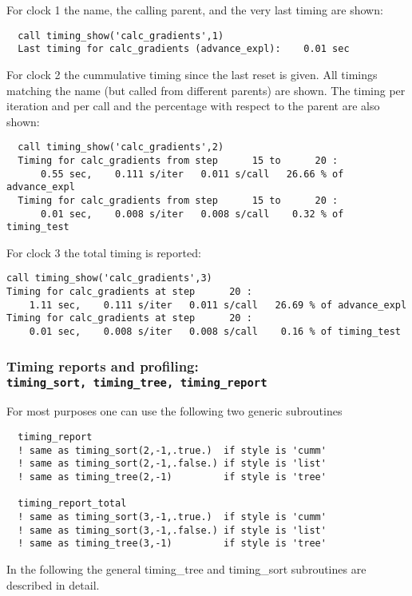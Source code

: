 For clock 1 the name, the calling parent, and the very last timing are shown:
\begin{verbatim}
  call timing_show('calc_gradients',1)
  Last timing for calc_gradients (advance_expl):    0.01 sec
\end{verbatim}
For clock 2 the cummulative timing since the last reset is given.
All timings matching the name (but called from different parents) are shown.
The timing per iteration and per call and the percentage
with respect to the parent are also shown:
{\small
\begin{verbatim}
  call timing_show('calc_gradients',2)
  Timing for calc_gradients from step      15 to      20 :
      0.55 sec,    0.111 s/iter   0.011 s/call   26.66 % of advance_expl
  Timing for calc_gradients from step      15 to      20 :
      0.01 sec,    0.008 s/iter   0.008 s/call    0.32 % of timing_test
\end{verbatim}
}
For clock 3 the total timing is reported:
{\small
\begin{verbatim}
call timing_show('calc_gradients',3)
Timing for calc_gradients at step      20 :
    1.11 sec,    0.111 s/iter   0.011 s/call   26.69 % of advance_expl
Timing for calc_gradients at step      20 :
    0.01 sec,    0.008 s/iter   0.008 s/call    0.16 % of timing_test
\end{verbatim}
}

\subsubsection{Timing reports and profiling: \\
      {\tt timing\_sort, timing\_tree, timing\_report}}

For most purposes one can use the following two generic subroutines
\begin{verbatim}
  timing_report  
  ! same as timing_sort(2,-1,.true.)  if style is 'cumm'
  ! same as timing_sort(2,-1,.false.) if style is 'list'
  ! same as timing_tree(2,-1)         if style is 'tree'

  timing_report_total
  ! same as timing_sort(3,-1,.true.)  if style is 'cumm'
  ! same as timing_sort(3,-1,.false.) if style is 'list'
  ! same as timing_tree(3,-1)         if style is 'tree'
\end{verbatim}
In the following the general timing\_tree and timing\_sort
subroutines are described in detail. 

